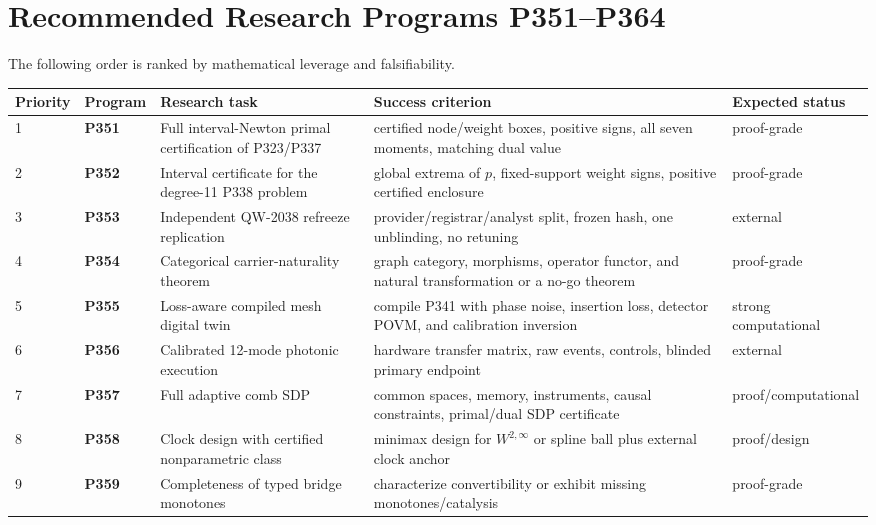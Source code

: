 \documentclass[11pt,a4paper,openany]{report}
\begin{document}
\chapter{Recommended Research Programs P351--P364}

The following order is ranked by mathematical leverage and falsifiability.

\begin{center}
\begingroup\fontsize{7}{8.4}\selectfont
\setlength{\tabcolsep}{2.5pt}
\renewcommand{\arraystretch}{1.16}
\begin{longtable}{@{}p{}p{}p{}p{}p{}@{}}
\toprule
\textbf{Priority} & \textbf{Program} & \textbf{Research task} & \textbf{Success criterion} & \textbf{Expected status} \\
\midrule
\endhead
1 & \textbf{P351} & Full interval-Newton primal certification of P323/\allowbreak{}P337 & certified node/\allowbreak{}weight boxes, positive signs, all seven moments, matching dual value & proof-grade \\
2 & \textbf{P352} & Interval certificate for the degree-11 P338 problem & global extrema of \(p\), fixed-support weight signs, positive certified enclosure & proof-grade \\
3 & \textbf{P353} & Independent QW-2038 refreeze replication & provider/\allowbreak{}registrar/\allowbreak{}analyst split, frozen hash, one unblinding, no retuning & external \\
4 & \textbf{P354} & Categorical carrier-naturality theorem & graph category, morphisms, operator functor, and natural transformation or a no-go theorem & proof-grade \\
5 & \textbf{P355} & Loss-aware compiled mesh digital twin & compile P341 with phase noise, insertion loss, detector POVM, and calibration inversion & strong computational \\
6 & \textbf{P356} & Calibrated 12-mode photonic execution & hardware transfer matrix, raw events, controls, blinded primary endpoint & external \\
7 & \textbf{P357} & Full adaptive comb SDP & common spaces, memory, instruments, causal constraints, primal/\allowbreak{}dual SDP certificate & proof/\allowbreak{}computational \\
8 & \textbf{P358} & Clock design with certified nonparametric class & minimax design for \(W^{2,\infty}\) or spline ball plus external clock anchor & proof/\allowbreak{}design \\
9 & \textbf{P359} & Completeness of typed bridge monotones & characterize convertibility or exhibit missing monotones/\allowbreak{}catalysis & proof-grade \\

\end{longtable}
\end{center}
\end{document}
